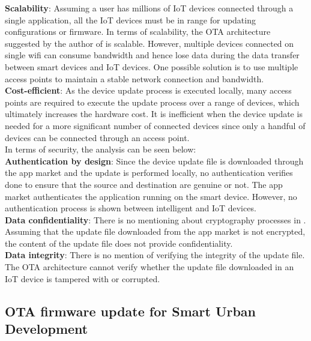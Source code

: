 \documentclass[12pt,a4paper]{article}
\begin{document}
{\textbf{Scalability}: Assuming a user has millions of IoT devices connected through a single application, all the IoT devices must be in range for updating configurations or firmware. In terms of scalability, the OTA architecture suggested by the author of \cite{r29} is scalable. However, multiple devices connected on single wifi can consume bandwidth and hence lose data during the data transfer between smart devices and IoT devices. One possible solution is to use multiple access points to maintain a stable network connection and bandwidth. \cite{r35} \\

\textbf{Cost-efficient}: As the device update process is executed locally, many access points are required to execute the update process over a range of devices, which ultimately increases the hardware cost. It is inefficient when the device update is needed for a more significant number of connected devices since only a handful of devices can be connected through an access point. \\

In terms of security, the analysis can be seen below: \\

\textbf{Authentication by design}: Since the device update file is downloaded through the app market and the update is performed locally, no authentication verifies done to ensure that the source and destination are genuine or not. The app market authenticates the application running on the smart device. However, no authentication process is shown between intelligent and IoT devices. \\

\textbf{Data confidentiality}: There is no mentioning about cryptography processes in \cite{r29}. Assuming that the update file downloaded from the app market is not encrypted, the content of the update file does not provide confidentiality. \\

\textbf{Data integrity}: There is no mention of verifying the integrity of the update file. The OTA architecture cannot verify whether the update file downloaded in an IoT device is tampered with or corrupted. \\

\subsection{OTA firmware update for Smart Urban Development}

}
\end{document}
